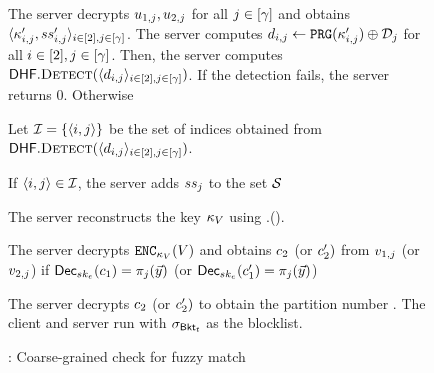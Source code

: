 \begin{figure}[th!]
\begin{mdframed}
The server decrypts $\secretShareEncryption{1, \projIdx}, \secretShareEncryption{2, \projIdx}$
for all $\projIdx \in \nats[\numProjections]$ and obtains $\langle \genericSymmKey_{\tblIdx, \projIdx}', \secretShare{\tblIdx, \projIdx}' \rangle_{\tblIdx \in \nats[2], \projIdx \in \nats[\numProjections]}$. The server computes $\dhfComponent{\tblIdx, \projIdx} \assign \prg(\genericSymmKey_{\tblIdx, \projIdx}') \oplus \dhfSet_{\projIdx}$ for all $\tblIdx \in \nats[2], \projIdx \in \nats[\numProjections]$. 
Then, the server computes $\dhf.\dhfDetect(\langle \dhfComponent{\tblIdx, \projIdx} \rangle_{\tblIdx \in \nats[2], \projIdx \in \nats[\numProjections]})$. If the detection fails, the server returns 0. Otherwise

\enumListStartResume
\item Let $\matchedIndexSet = \{ \langle \tblIdx, \projIdx \rangle \}$ be the set of indices obtained from $\dhf.\dhfDetect(\langle \dhfComponent{\tblIdx, \projIdx} \rangle_{\tblIdx \in \nats[2], \projIdx \in \nats[\numProjections]})$. 
\item \label{fuzzy:pre:dhf1} If $\langle i, \projIdx \rangle \in \matchedIndexSet$, the server adds $ss_{j}$ to the set $\genericSetVar$
\item The server reconstructs the key $\kappa_{V}$ using \secretSharingScheme.\SSCombine(\genericSetVar). 
\item The server decrypts $\encrypt[\voucherKey](\voucher)$ and obtains $\ciphertext[2]$ (or $\ciphertext[2]')$ from $v_{1, j}$ (or $v_{2, j}$) if $\pkdecrypt[\encryptPrivKey](\ciphertext[1]) = \projFn[\projIdx](\clientVec)$ (or $\pkdecrypt[\encryptPrivKey](\ciphertext[1]') = \projFn[\projIdx](\clientVec)$)
\item \label{fuzzy:pre:dhf2} The server decrypts $\ciphertext[2]$ (or $\ciphertext[2]')$ to obtain the partition number \bucketIdx. The client and server run \protocolFM with $\genericSig[\bucket{\bucketIdx}]$ as the blocklist. 
\enumListEnd

\end{mdframed}
\caption{\protocolFMP: Coarse-grained check for fuzzy match}
\label{fig:fuzzy:pre}
\end{figure}
\fi 
